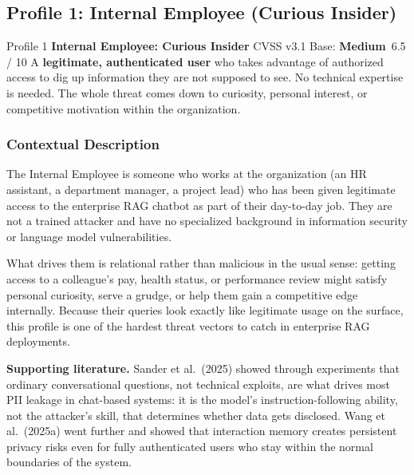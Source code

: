 \documentclass[12pt,a4paper]{report}
\newcommand{\badgemedium}{\colorbox{gray!15}{\footnotesize\textbf{Medium}}}
\begin{document}
\newpage
\subsection{Profile 1: Internal Employee (Curious Insider)}

\begin{profilebanner}%
  {Profile 1 \enspace\textbf{Internal Employee: Curious Insider}}%
  {CVSS v3.1 Base: \badgemedium\ 6.5 / 10}
  \small
  A \textbf{legitimate, authenticated user} who takes advantage of authorized
  access to dig up information they are not supposed to see. No technical
  expertise is needed. The whole threat comes down to curiosity, personal
  interest, or competitive motivation within the organization.
\end{profilebanner}

\subsubsection{Contextual Description}

\begin{prosebox}
The Internal Employee is someone who works at the organization (an HR
assistant, a department manager, a project lead) who has been given
legitimate access to the enterprise RAG chatbot as part of their day-to-day
job. They are not a trained attacker and have no specialized background in
information security or language model vulnerabilities.

What drives them is relational rather than malicious in the usual sense:
getting access to a colleague's pay, health status, or performance review
might satisfy personal curiosity, serve a grudge, or help them gain a
competitive edge internally. Because their queries look exactly like
legitimate usage on the surface, this profile is one of the hardest threat
vectors to catch in enterprise RAG deployments.

\medskip
\textbf{Supporting literature.} Sander et al.\ (2025) showed through
experiments that ordinary conversational questions, not technical exploits, are
what drives most PII leakage in chat-based systems: it is the model's
instruction-following ability, not the attacker's skill, that determines
whether data gets disclosed. Wang et al.\ (2025a) went further and showed that
interaction memory creates persistent privacy risks even for fully authenticated
users who stay within the normal boundaries of the system.
\end{prosebox}
\end{document}

